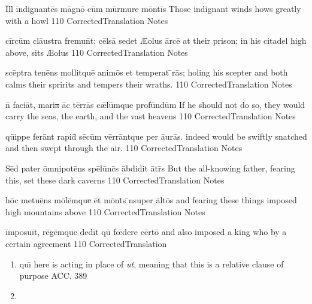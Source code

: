 \documentclass[]{book}
\begin{document}
\latline
  {\=Ill\={\macron {\i}} \=ind\-ign\-ant\={\macron e}s m\=agn\={\macron o} c\=um m\=urm\-ur\-e m\=ont\=is
}
  { Those indignant winds hows greatly with a howl }
  {110}
  { CorrectedTranslation }
  { Notes }

\newpage
\latline
  {c\=irc\=um cl\={au}str\-a fr\-emu\=nt; c\=els\={\macron a} s\-ed\-et \={\AE}\-ol\-us \=arc\=e
}
  { at their prison; in his citadel high above, sits {\AE}olus }
  {110}
  { CorrectedTranslation }
  { Notes }


\latline
  {sc\={\macron e}ptr\-a t\-en\={\macron e}ns m\-oll\-itqu\=e \-an\-im\={\macron o}s et temperat \={\macron {\i}}r\={\macron a}s;
}
  { holing his scepter and both calms their spririts and tempers their wraths. }
  {110}
  { CorrectedTranslation }
  { Notes }


\latline
  {n\={\macron {\i}} f\-ac\-i\=at, m\-ar\-i\sout{a }\=ac t\=err\={\macron a}s c\={\ae}l\=umqu\-e pr\-of\=und\=um
}
  { If he should not do so, they would carry the seas, the earth, and the vast heavens }
  {110}
  { CorrectedTranslation }
  { Notes }

\newpage
\latline
  {q\={ui}pp\-e f\-er\=ant r\-ap\-id\={\macron {\i}} s\={\macron e}c\=um v\=err\=antqu\-e p\-er \={au}r\={\macron a}s.
}
  { indeed would be swiftly snatched and then swept through the air. }
  {110}
  { CorrectedTranslation }
  { Notes }


\latline
  {S\=ed p\-at\-er \=omn\-ip\-ot\={\macron e}ns sp\={\macron e}l\=unc\={\macron {\i}}s \=abd\-id\-it \={\macron a}tr\={\macron {\i}}s
}
  { But the all-knowing father, fearing this, set these dark caverns }
  {110}
  { CorrectedTranslation }
  { Notes }


\latline
  {h\=oc m\-et\-u\={\macron e}ns m\={\macron o}l\=emqu\sout{e }\=et m\=ont\={\macron {\i}}s \={\macron {\i}}ns\-upe\-r \=alt\={\macron o}s
}
  { and fearing these things imposed high mountains above }
  {110}
  { CorrectedTranslation }
  { Notes }

\newpage
\latline
  {\=imp\-os\-u\=it, r\={\macron e}g\=emqu\-e d\-ed\=it qu\={\macron {\i}} f\={\oe}d\-er\-e c\=ert\={\macron o}
}
  { and also imposed a king who by a certain agreement }
  {110}
  { CorrectedTranslation }
  { \begin{enumerate}
  	\item qu\={\i} here is acting in place of \emph{ut}, meaning that this is a relative clause of purpose ACC. 389
  	\item 
  \end{enumerate} }
\end{document}
